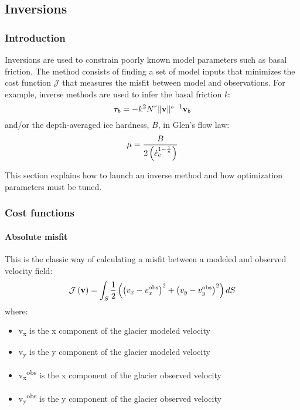 
\subsection{Inversions} \label{sec:using-issm-advanced-inversions}
\subsubsection{Introduction}%
Inversions are used to constrain poorly known model parameters such as basal friction. The method consists of finding a set of model inputs that minimizes the cost function ${\mathcal J}$ that measures the misfit between model and observations. For example, inverse methods are used to infer the basal friction $k$:
\begin{equation}
	\boldsymbol{\tau}_b = -k^2 N^r \|{\bf v}\|^{s-1} {\bf v}_b
\end{equation}
and/or the depth-averaged ice hardness, $B$, in Glen's flow law:
\begin{equation}
	\mu = \frac{B}{2\left( \dot{\varepsilon}_e^{1-\frac{1}{n}}\right) }\\
\end{equation}

This section explains how to launch an inverse method and how optimization parameters must be tuned.

\subsubsection{Cost functions}%
\paragraph{Absolute misfit}%
This is the classic way of calculating a misfit between a modeled and observed velocity field:
\begin{equation}
	{\mathcal J\left({\bf v}\right)}
	=\int_{S} \dfrac{1}{2}\left( 
	 \left(v_x-v_x^{\text{obs}}\right)^{2}
	+\left(v_y-v_y^{\text{obs}}\right)^{2}
	\right) dS
\end{equation}
where:
\begin{itemize}
	\item v\textsubscript{x} is the x component of the glacier modeled velocity
	\item v\textsubscript{y} is the y component of the glacier modeled velocity
	\item v\textsubscript{x}\textsuperscript{obs} is the x component of the glacier observed velocity
	\item v\textsubscript{y}\textsuperscript{obs} is the y component of the glacier observed velocity
\end{itemize}

